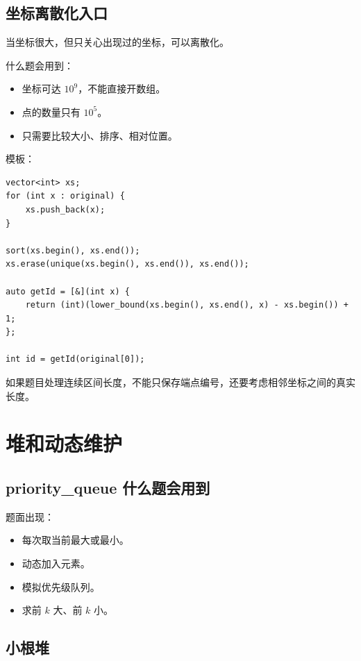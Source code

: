 \subsection{坐标离散化入口}

当坐标很大，但只关心出现过的坐标，可以离散化。

什么题会用到：

\begin{itemize}
  \item 坐标可达 $10^9$，不能直接开数组。
  \item 点的数量只有 $10^5$。
  \item 只需要比较大小、排序、相对位置。
\end{itemize}

模板：

\begin{lstlisting}
vector<int> xs;
for (int x : original) {
    xs.push_back(x);
}

sort(xs.begin(), xs.end());
xs.erase(unique(xs.begin(), xs.end()), xs.end());

auto getId = [&](int x) {
    return (int)(lower_bound(xs.begin(), xs.end(), x) - xs.begin()) + 1;
};

int id = getId(original[0]);
\end{lstlisting}

如果题目处理连续区间长度，不能只保存端点编号，还要考虑相邻坐标之间的真实长度。

\section{堆和动态维护}\label{sec:06-13}

\subsection{priority\_queue 什么题会用到}

题面出现：

\begin{itemize}
  \item 每次取当前最大或最小。
  \item 动态加入元素。
  \item 模拟优先级队列。
  \item 求前 $k$ 大、前 $k$ 小。
\end{itemize}

\subsection{小根堆}

